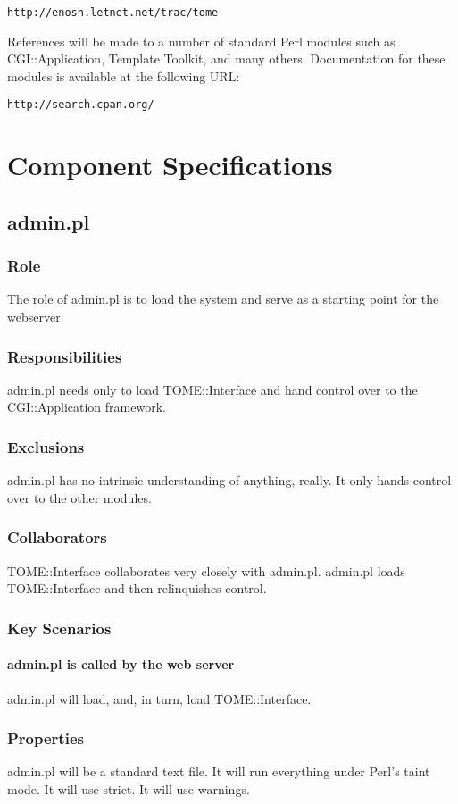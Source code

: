 \documentclass[12pt,titlepage]{article}
\begin{document}
\texttt{http://enosh.letnet.net/trac/tome}

References will be made to a number of standard Perl modules such as CGI::Application, Template Toolkit, and many others.  Documentation for these modules is available at the following URL:

\texttt{http://search.cpan.org/}

\section{Component Specifications}

\subsection{admin.pl}
\subsubsection{Role}
The role of admin.pl is to load the system and serve as a starting point for the webserver
\subsubsection{Responsibilities}
admin.pl needs only to load TOME::Interface and hand control over to the CGI::Application framework.
\subsubsection{Exclusions}
admin.pl has no intrinsic understanding of anything, really.  It only hands control over to the other modules.
\subsubsection{Collaborators}
TOME::Interface collaborates very closely with admin.pl.  admin.pl loads TOME::Interface and then relinquishes control.
\subsubsection{Key Scenarios}
\paragraph{admin.pl is called by the web server}
admin.pl will load, and, in turn, load TOME::Interface.
\subsubsection{Properties}
admin.pl will be a standard text file.  It will run everything under Perl's taint mode.  It will use strict.  It will use warnings. 
\end{document}
